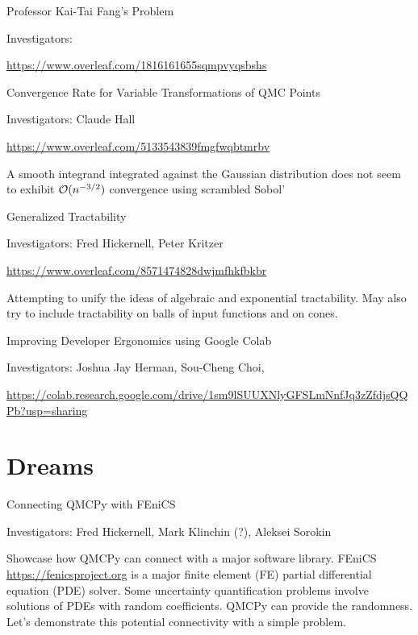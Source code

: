 \documentclass[10pt,compress,xcolor={usenames,dvipsnames},aspectratio=169]{beamer}
\begin{document}
\begin{frame}{Professor Kai-Tai Fang's Problem}

Investigators: 

\url{https://www.overleaf.com/1816161655sqmpvyqsbshs}
   
\end{frame}


\begin{frame}{Convergence Rate for Variable Transformations of QMC Points}

Investigators: Claude Hall

\url{https://www.overleaf.com/5133543839fmgfwqbtmrbv}
    
    A smooth integrand integrated against the Gaussian distribution does not seem to exhibit $\operatorname{{\mathcal O}}(n^{-3/2})$ convergence using scrambled Sobol'
    
    
\end{frame}


\begin{frame}{Generalized Tractability }

Investigators: Fred Hickernell, Peter Kritzer

\url{https://www.overleaf.com/8571474828dwjmfhkfbkbr}

Attempting to unify the ideas of algebraic and exponential tractability.  May also try to include tractability on balls of input functions and on cones.

\end{frame}

\begin{frame}{Improving Developer Ergonomics using Google Colab}

Investigators: Joshua Jay Herman, Sou-Cheng Choi, 

\url{https://colab.research.google.com/drive/1sm9lSUUXNlyGFSLmNnfJq3zZfdjsQQPb?usp=sharing}
   
\end{frame}


\section{Dreams}

\begin{frame}{Connecting QMCPy with FEniCS}

Investigators: Fred Hickernell, Mark Klinchin (?), Aleksei Sorokin

Showcase how QMCPy can connect with a major software library.  FEniCS \url{https://fenicsproject.org} is a major finite element (FE) partial differential equation (PDE) solver.  Some uncertainty quantification problems involve solutions of PDEs with random coefficients.  QMCPy can provide the randomness.  Let's demonstrate this potential connectivity with a simple problem.
   
\end{frame}
\end{document}
